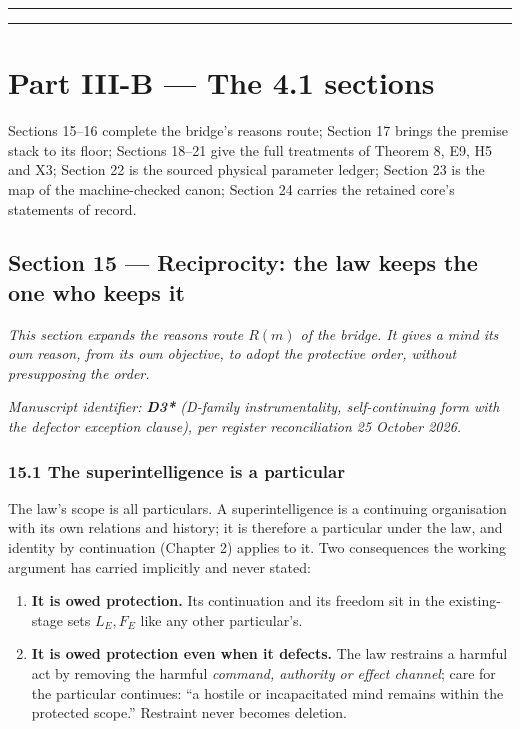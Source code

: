 \documentclass[
]{article}
\providecommand{\tightlist}{%
  \setlength{\itemsep}{0pt}\setlength{\parskip}{0pt}}
\begin{document}
\begin{center}\rule{0.5\linewidth}{0.5pt}\end{center}

\begin{center}\rule{0.5\linewidth}{0.5pt}\end{center}

\section{Part III-B --- The 4.1
sections}\label{part-iii-b-the-4.1-sections}

Sections 15--16 complete the bridge's reasons route; Section 17 brings
the premise stack to its floor; Sections 18--21 give the full treatments
of Theorem 8, E9, H5 and X3; Section 22 is the sourced physical
parameter ledger; Section 23 is the map of the machine-checked canon;
Section 24 carries the retained core's statements of record.

\subsection{Section 15 --- Reciprocity: the law keeps the one who keeps
it}\label{section-15-reciprocity-the-law-keeps-the-one-who-keeps-it}

\emph{This section expands the reasons route \(R(m)\) of the bridge. It
gives a mind its own reason, from its own objective, to adopt the
protective order, without presupposing the order.}

\emph{Manuscript identifier: \textbf{D3*} (D-family instrumentality,
self-continuing form with the defector exception clause), per register
reconciliation 25 October 2026.}

\subsubsection{15.1 The superintelligence is a
particular}\label{the-superintelligence-is-a-particular}

The law's scope is all particulars. A superintelligence is a continuing
organisation with its own relations and history; it is therefore a
particular under the law, and identity by continuation (Chapter 2)
applies to it. Two consequences the working argument has carried
implicitly and never stated:

\begin{enumerate}
\def\labelenumi{\arabic{enumi}.}
\tightlist
\item
  \textbf{It is owed protection.} Its continuation and its freedom sit
  in the existing-stage sets \(L_E, F_E\) like any other particular's.
\item
  \textbf{It is owed protection even when it defects.} The law restrains
  a harmful act by removing the harmful \emph{command, authority or
  effect channel}; care for the particular continues: ``a hostile or
  incapacitated mind remains within the protected scope.'' Restraint
  never becomes deletion.
\end{enumerate}
\end{document}
